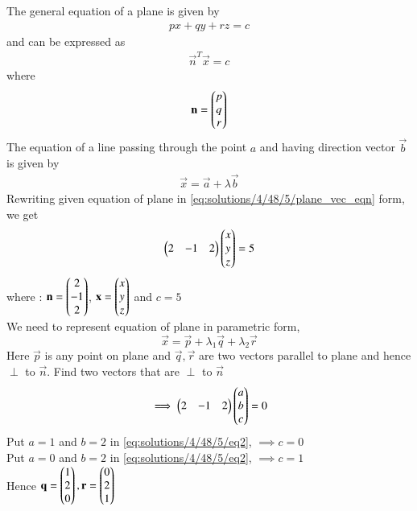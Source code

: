 
The general equation of a plane is given by
\begin{align}
    px+qy+rz = c \label{eq:solutions/4/48/5/gen_plane_eqn}
\end{align}
and can be expressed as
\begin{align}
    \vec{n}^T\vec{x} = c \label{eq:solutions/4/48/5/plane_vec_eqn}
\end{align}
where
\begin{align}
    \mathbf{n} = \begin{pmatrix}p \\ q \\ r\end{pmatrix}
\end{align}
The equation of a line passing through the point $a$ and having direction vector $\vec{b}$ is given by
\begin{align}
    \vec{x} = \vec{a} +\lambda \vec{b} \label{eq:solutions/4/48/5/vec_line_eq}
\end{align}
Rewriting given equation of plane in \eqref{eq:solutions/4/48/5/plane_vec_eqn} form, we get
\begin{align}\label{eq:solutions/4/48/5/eq0}
	\begin{pmatrix}2 & -1 & 2\end{pmatrix}\begin{pmatrix}x\\y\\z\end{pmatrix} = 5
\end{align}
where :
$\mathbf{n}=\begin{pmatrix}2\\ -1 \\2\end{pmatrix}$, $\mathbf{x} = \begin{pmatrix}x\\y\\z\end{pmatrix}$  and $c=5$\\
We need to represent equation of plane in parametric form,
\begin{equation}\label{eq:solutions/4/48/5/eq1}
	\vec{x} = \vec{p} + \lambda_1\vec{q} + \lambda_2\vec{r}
\end{equation}
Here $\vec{p}$ is any point on plane and $\vec{q}, \vec{r}$ are two vectors parallel to plane and hence $\perp$ to $\vec{n}$. Find two vectors that are $\perp$ to $\vec{n}$
\begin{align}\label{eq:solutions/4/48/5/eq2}
	\implies\begin{pmatrix}2 & -1 & 2\end{pmatrix}\begin{pmatrix}a\\b\\c\end{pmatrix} = 0
\end{align}
Put $a=1$ and $b=2$ in \eqref{eq:solutions/4/48/5/eq2}, $\implies c=0$\\
Put $a=0$ and $b=2$ in \eqref{eq:solutions/4/48/5/eq2}, $\implies c=1$\\
Hence $\mathbf{q} = \begin{pmatrix}1\\2\\0\end{pmatrix}, \mathbf{r} = \begin{pmatrix}0\\2\\1\end{pmatrix}$\\
